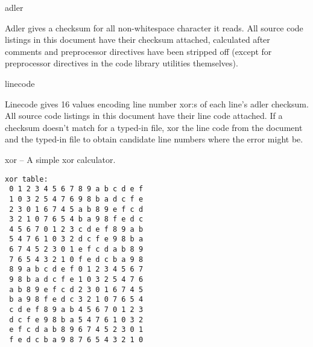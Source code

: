 
\begin{algorithm}{adler}

Adler gives a checksum for all non-whitespace character it reads.
All source code listings in this document have their checksum attached,
calculated after comments and preprocessor directives have been stripped off
(except for preprocessor directives in the code library utilities themselves).
\end{algorithm}

\begin{algorithm}{linecode}

Linecode gives 16 values encoding line number xor:s of each line's adler
checksum. All source code listings in this document have their line code
attached. If a checksum doesn't match for a typed-in file, xor the line code
from the document and the typed-in file to obtain candidate line numbers where
the error might be.
\end{algorithm}

\begin{algorithm}{xor}
-- A simple xor calculator.
\end{algorithm}

\begin{sourceslandscape}
\end{sourceslandscape}
\begin{sourceslandscape}
  \begin{verbatim}
xor table:
 0 1 2 3 4 5 6 7 8 9 a b c d e f
 1 0 3 2 5 4 7 6 9 8 b a d c f e
 2 3 0 1 6 7 4 5 a b 8 9 e f c d
 3 2 1 0 7 6 5 4 b a 9 8 f e d c
 4 5 6 7 0 1 2 3 c d e f 8 9 a b
 5 4 7 6 1 0 3 2 d c f e 9 8 b a
 6 7 4 5 2 3 0 1 e f c d a b 8 9
 7 6 5 4 3 2 1 0 f e d c b a 9 8
 8 9 a b c d e f 0 1 2 3 4 5 6 7
 9 8 b a d c f e 1 0 3 2 5 4 7 6
 a b 8 9 e f c d 2 3 0 1 6 7 4 5
 b a 9 8 f e d c 3 2 1 0 7 6 5 4
 c d e f 8 9 a b 4 5 6 7 0 1 2 3
 d c f e 9 8 b a 5 4 7 6 1 0 3 2
 e f c d a b 8 9 6 7 4 5 2 3 0 1
 f e d c b a 9 8 7 6 5 4 3 2 1 0
  \end{verbatim}
\end{sourceslandscape}
